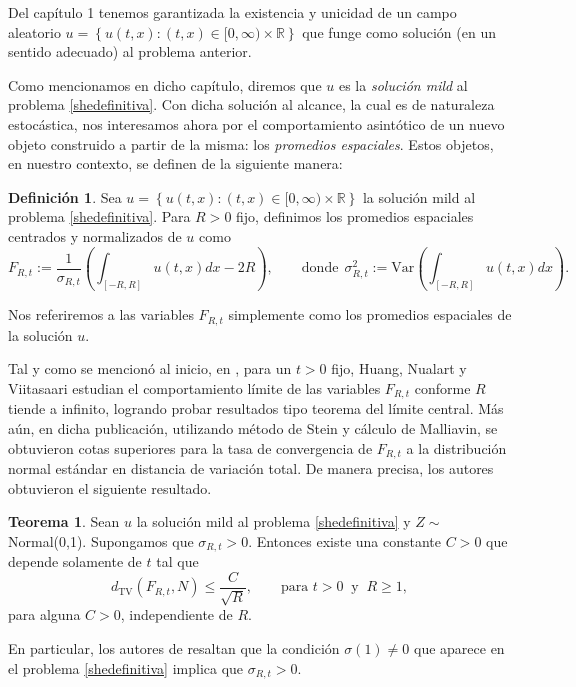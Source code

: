 \documentclass[letterpaper,twoside,12pt]{book}
\newcommand{\R}{\mathbb{R}}
\newcommand{\1}{\mathds{1}}
\theoremstyle{definition}
\newtheorem{dfn}{Definición}
\theoremstyle{definition}
\newtheorem{teo}{Teorema}
\theoremstyle{remark}
\theoremstyle{definition}
\theoremstyle{definition}
\theoremstyle{definition}
\theoremstyle{definition}
\theoremstyle{definition}
\begin{document}
Del capítulo 1 tenemos garantizada la existencia y unicidad de un campo aleatorio  $u=\left\{u(t,x):(t,x)\in [0,\infty)\times\R\right\}$ que funge como solución (en un sentido adecuado) al problema anterior. 

Como mencionamos en dicho capítulo, diremos que $u$ es la \textit{solución mild} al problema \eqref{shedefinitiva}. Con dicha solución al alcance, la cual es de naturaleza estocástica, nos interesamos ahora por el comportamiento asintótico de un nuevo objeto construido a partir de la misma: los \textit{promedios espaciales}. Estos objetos, en nuestro contexto, se definen de la siguiente manera:

\begin{dfn}\label{defpromediosespaciales}
 Sea $u=\left\{u(t,x):(t,x)\in [0,\infty)\times\R\right\}$ la solución mild al problema \eqref{shedefinitiva}. Para $R>0$ fijo, definimos los promedios espaciales centrados y normalizados de $u$ como 
 \begin{equation*}
   F_{R,t}:=\frac{1}{\sigma_{R,t}}\left(\int_{[-R,R]}u(t,x)dx -2R\right), \qquad \text{donde} \ \ \sigma^2_{R,t}:=\text{Var}\left(\int_{[-R,R]}u(t,x)dx\right).
\end{equation*}
 \end{dfn}
Nos referiremos a las variables $F_{R,t}$ simplemente como los promedios espaciales de la solución $u$.

Tal y como se mencionó al inicio, en \cite{HUANG20207170}, para un $t>0$ fijo, Huang, Nualart y Viitasaari estudian el comportamiento límite de las variables $F_{R,t}$ conforme $R$ tiende a infinito, logrando probar resultados tipo teorema del límite central. Más aún, en dicha publicación, utilizando método de Stein y cálculo de Malliavin, se obtuvieron cotas superiores para la tasa de convergencia de $F_{R,t}$ a la distribución normal estándar en distancia de variación total. De manera precisa, los autores obtuvieron el siguiente resultado.

\begin{teo} 
 Sean $u$ la solución mild al problema \eqref{shedefinitiva} y $Z\sim$ Normal(0,1). Supongamos que $\sigma_{R,t}>0$. Entonces existe una constante $C>0$ que depende solamente de $t$ tal que 
 \begin{equation}\label{teohuang}
    d_{\text{TV}}(F_{R,t},N)\leq \frac{C}{\sqrt{R}}, \qquad \text{para }t>0 \ \text{ y } \ R\geq1,  
 \end{equation}
 para alguna $C>0$, independiente de $R$.
 \end{teo}
En particular, los autores de \cite{HUANG20207170} resaltan que la condición $\sigma(1)\neq 0$ que aparece en el problema \eqref{shedefinitiva} implica que $\sigma_{R,t}>0$.
\end{document}

